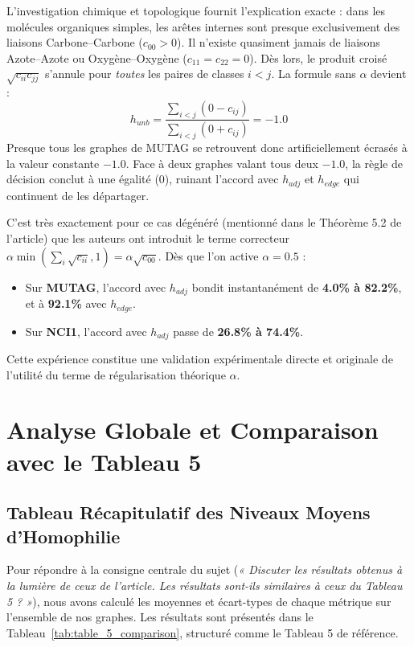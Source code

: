 \documentclass[11pt,a4paper]{article}
\begin{document}
L'investigation chimique et topologique fournit l'explication exacte : dans les molécules organiques simples, les arêtes internes sont presque exclusivement des liaisons Carbone--Carbone ($c_{00} > 0$). Il n'existe quasiment jamais de liaisons Azote--Azote ou Oxygène--Oxygène ($c_{11} = c_{22} = 0$). Dès lors, le produit croisé $\sqrt{c_{ii} c_{jj}}$ s'annule pour \textit{toutes} les paires de classes $i < j$. La formule sans $\alpha$ devient :
\begin{equation}
    h_{unb} = \frac{\sum_{i<j} (0 - c_{ij})}{\sum_{i<j} (0 + c_{ij})} = -1.0
\end{equation}
Presque tous les graphes de MUTAG se retrouvent donc artificiellement écrasés à la valeur constante $-1.0$. Face à deux graphes valant tous deux $-1.0$, la règle de décision conclut à une égalité ($0$), ruinant l'accord avec $h_{adj}$ et $h_{edge}$ qui continuent de les départager.

C'est très exactement pour ce cas dégénéré (mentionné dans le Théorème 5.2 de l'article) que les auteurs ont introduit le terme correcteur $\alpha \min(\sum_i \sqrt{c_{ii}}, 1) = \alpha \sqrt{c_{00}}$. Dès que l'on active $\alpha = 0.5$ :
\begin{itemize}[leftmargin=1.5em]
    \item Sur \textbf{MUTAG}, l'accord avec $h_{adj}$ bondit instantanément de \textbf{4.0\% à 82.2\%}, et à \textbf{92.1\%} avec $h_{edge}$.
    \item Sur \textbf{NCI1}, l'accord avec $h_{adj}$ passe de \textbf{26.8\% à 74.4\%}.
\end{itemize}
Cette expérience constitue une validation expérimentale directe et originale de l'utilité du terme de régularisation théorique $\alpha$.

\section{Analyse Globale et Comparaison avec le Tableau 5}

\subsection{Tableau Récapitulatif des Niveaux Moyens d'Homophilie}

Pour répondre à la consigne centrale du sujet (\textit{« Discuter les résultats obtenus à la lumière de ceux de l'article. Les résultats sont-ils similaires à ceux du Tableau 5 ? »}), nous avons calculé les moyennes et écart-types de chaque métrique sur l'ensemble de nos graphes. Les résultats sont présentés dans le Tableau~\ref{tab:table_5_comparison}, structuré comme le Tableau 5 de référence.
\end{document}
